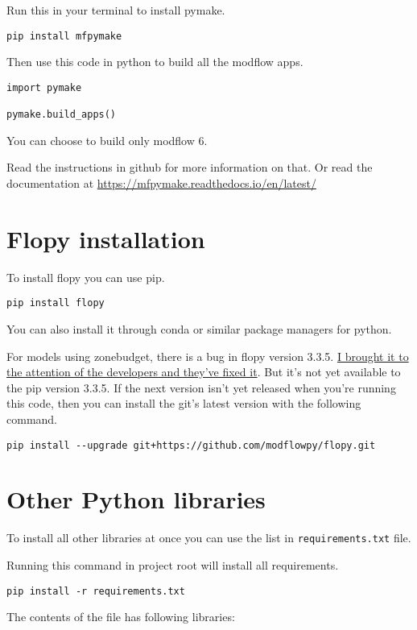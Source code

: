 \documentclass[titlepage,12pt]{unisubmission}
\begin{document}
Run this in your terminal to install pymake.
\begin{verbatim}
pip install mfpymake  
\end{verbatim}

Then use this code in python to build all the modflow apps.
\begin{verbatim}
import pymake

pymake.build_apps()
\end{verbatim}

You can choose to build only modflow 6.

Read the instructions in github for more information on that. Or read the documentation at \url{https://mfpymake.readthedocs.io/en/latest/}

\section{Flopy installation}
\label{sec:org26db465}
To install flopy you can use pip.
\begin{verbatim}
pip install flopy
\end{verbatim}

You can also install it through conda or similar package managers for python.

For models using zonebudget, there is a bug in flopy version 3.3.5. \href{https://github.com/modflowpy/flopy/issues/1395}{I brought it to the attention of the developers and they've fixed it}. But it's not yet available to the pip version 3.3.5. If the next version isn't yet released when you're running this code, then you can install the git's latest version with the following command.

\begin{verbatim}
pip install --upgrade git+https://github.com/modflowpy/flopy.git
\end{verbatim}


\section{Other Python libraries}
\label{sec:org690f59d}
To install all other libraries at once you can use the list in \texttt{requirements.txt} file.

Running this command in project root will install all requirements.
\begin{verbatim}
pip install -r requirements.txt
\end{verbatim}

The contents of the file has following libraries:
\end{document}
